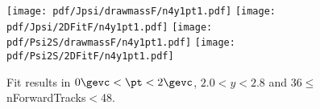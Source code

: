 \begin{figure}[H]
\begin{center}
\texttt{[image: pdf/Jpsi/drawmassF/n4y1pt1.pdf]}
\texttt{[image: pdf/Jpsi/2DFitF/n4y1pt1.pdf]}
\vspace*{-0.5cm}
\texttt{[image: pdf/Psi2S/drawmassF/n4y1pt1.pdf]}
\texttt{[image: pdf/Psi2S/2DFitF/n4y1pt1.pdf]}
\vspace*{-0.5cm}
\end{center}
\caption{Fit results in $0\gevc<\pt<2\gevc$, $2.0<y<2.8$ and 36$\leq$nForwardTracks$<$48.}
\label{Fitn4y1pt1}
\end{figure}
